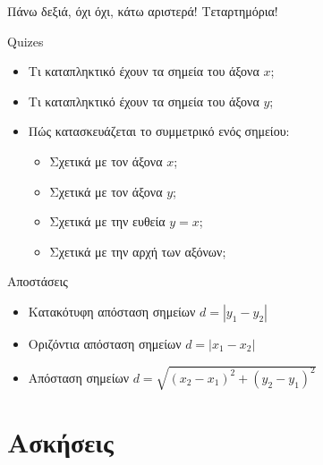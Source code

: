 \documentclass{presentation}
\begin{document}
\begin{frame}{Πάνω δεξιά, όχι όχι, κάτω αριστερά!}
  Τεταρτημόρια!
  \begin{center}
  \end{center}
\end{frame}

\begin{frame}{Quizes}
  \begin{itemize}[<+->]
    \item Τι καταπληκτικό έχουν τα σημεία του άξονα $x$;
    \item Τι καταπληκτικό έχουν τα σημεία του άξονα $y$;
    \item Πώς κατασκευάζεται το συμμετρικό ενός σημείου:
          \begin{itemize}[<+->]
            \item Σχετικά με τον άξονα $x$;
            \item Σχετικά με τον άξονα $y$;
            \item Σχετικά με την ευθεία $y=x$;
            \item Σχετικά με την αρχή των αξόνων;
          \end{itemize}
  \end{itemize}
\end{frame}

\begin{frame}{Αποστάσεις}
  \begin{itemize}[<+->]
    \item Κατακότυφη απόσταση σημείων  $d=|y_1-y_2|$
    \item Οριζόντια απόσταση σημείων  $d=|x_1-x_2|$
    \item Απόσταση σημείων  $d=\sqrt{(x_2-x_1)^2+(y_2-y_1)^2}$
  \end{itemize}
\end{frame}

\moodle

\section{Ασκήσεις}
\end{document}
